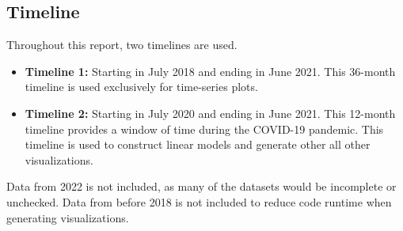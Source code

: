 \documentclass[11pt]{article}
\begin{document}
\subsection{Timeline}
Throughout this report, two timelines are used.
\begin{itemize}
    \item \textbf{Timeline 1:} Starting in July 2018 and ending in June 2021.
    This 36-month timeline is used exclusively for time-series plots.
    \item \textbf{Timeline 2:} Starting in July 2020 and ending in June 2021.
    This 12-month timeline provides a window of time during the COVID-19 pandemic.
    This timeline is used to construct linear models and generate other all other visualizations.
\end{itemize}
Data from 2022 is not included, as many of the datasets would be incomplete or unchecked.
Data from before 2018 is not included to reduce code runtime when generating visualizations.
\end{document}
